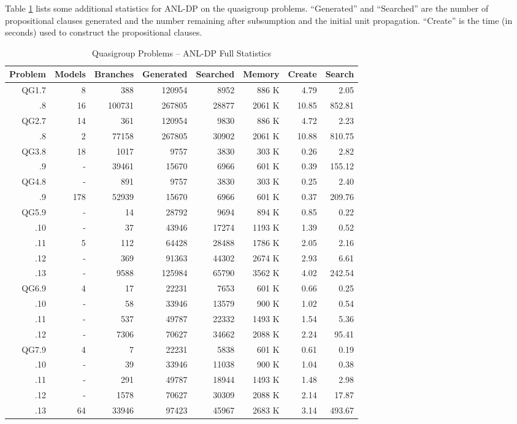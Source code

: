 Table \ref{qg-tab-stats} lists some additional statistics for ANL-DP
on the quasigroup problems.  ``Generated'' and ``Searched'' are the number
of propositional clauses generated and the number remaining after
subsumption and the initial unit propagation.  ``Create'' is the time
(in seconds) used to construct the propositional clauses.

\begin{table}[htb] \centering
\caption{Quasigroup Problems -- ANL-DP Full Statistics} \label{qg-tab-stats}
\begin{tabular}{rrrrrrrr}
Problem & Models & Branches & Generated & Searched & Memory & Create & Search \\
\hline
 QG1.7 &   8 &    388 & 120954 & 8952   & 886 K  &   4.79 &   2.05 \\
    .8 &  16 & 100731 & 267805 & 28877  & 2061 K &  10.85 & 852.81 \\
\hline
 QG2.7 &  14 &    361 & 120954 & 9830   & 886 K  &   4.72 &   2.23 \\
    .8 &   2 &  77158 & 267805 & 30902  & 2061 K &  10.88 & 810.75 \\
\hline
 QG3.8 &  18 &   1017 & 9757   & 3830   & 303 K  &   0.26 &   2.82 \\
    .9 &   - &  39461 & 15670  & 6966   & 601 K  &   0.39 & 155.12 \\
\hline
 QG4.8 &   - &    891 & 9757   & 3830   & 303 K  &   0.25 &   2.40 \\
    .9 & 178 &  52939 & 15670  & 6966   & 601 K  &   0.37 & 209.76 \\
\hline
QG5.9  &   - &     14 & 28792  & 9694   & 894 K  &   0.85 &   0.22 \\
   .10 &   - &     37 & 43946  & 17274  & 1193 K &   1.39 &   0.52 \\
   .11 &   5 &    112 & 64428  & 28488  & 1786 K &   2.05 &   2.16 \\
   .12 &   - &    369 & 91363  & 44302  & 2674 K &   2.93 &   6.61 \\
   .13 &   - &   9588 & 125984 & 65790  & 3562 K &   4.02 & 242.54 \\
\hline
QG6.9  &   4 &     17 & 22231  & 7653   & 601 K  &   0.66 &   0.25 \\
   .10 &   - &     58 & 33946  & 13579  & 900 K  &   1.02 &   0.54 \\
   .11 &   - &    537 & 49787  & 22332  & 1493 K &   1.54 &   5.36 \\
   .12 &   - &   7306 & 70627  & 34662  & 2088 K &   2.24 &  95.41 \\
\hline
QG7.9  &   4 &      7 & 22231  & 5838   & 601 K  &   0.61 &   0.19 \\
   .10 &   - &     39 & 33946  & 11038  & 900 K  &   1.04 &   0.38 \\
   .11 &   - &    291 & 49787  & 18944  & 1493 K &   1.48 &   2.98 \\
   .12 &   - &   1578 & 70627  & 30309  & 2088 K &   2.14 &  17.87 \\
   .13 &  64 &  33946 & 97423  & 45967  & 2683 K &   3.14 & 493.67 \\
\hline
\end{tabular}
\end{table}

